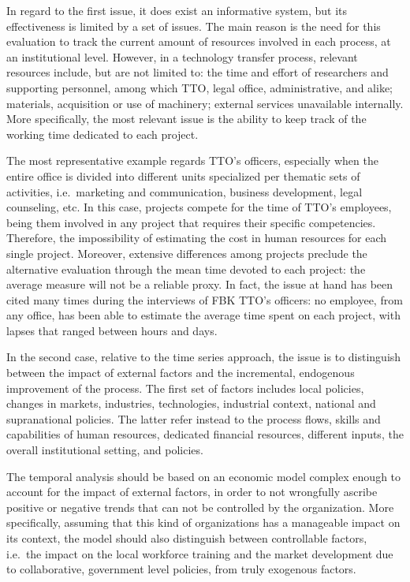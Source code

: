 In regard to the first issue, it does exist an informative system, but its effectiveness is limited by a set of issues. The main reason is the need for this evaluation to track the current amount of resources involved in each process, at an institutional level. However, in a technology transfer process, relevant resources include, but are not limited to: the time and effort of researchers and supporting personnel, among which TTO, legal office, administrative, and alike; materials, acquisition or use of machinery; external services unavailable internally. More specifically, the most relevant issue is the ability to keep track of the working time dedicated to each project. 

The most representative example regards TTO's officers, especially when the entire office is divided into different units specialized per thematic sets of activities, i.e.\ marketing and communication, business development, legal counseling, etc. In this case, projects compete for the time of TTO's employees, being them involved in any project that requires their specific competencies. Therefore, the impossibility of estimating the cost in human resources for each single project. Moreover, extensive differences among projects preclude the alternative evaluation through the mean time devoted to each project: the average measure will not be a reliable proxy. In fact, the issue at hand has been cited many times during the interviews of FBK TTO's officers: no employee, from any office, has been able to estimate the average time spent on each project, with lapses that ranged between hours and days.

In the second case, relative to the time series approach, the issue is to distinguish between the impact of external factors and the incremental, endogenous improvement of the process. The first set of factors includes local policies, changes in markets, industries, technologies, industrial context, national and supranational policies. The latter refer instead to the process flows, skills and capabilities of human resources, dedicated financial resources, different inputs, the overall institutional setting, and policies.

The temporal analysis should be based on an economic model complex enough to account for the impact of external factors, in order to not wrongfully ascribe positive or negative trends that can not be controlled by the organization. More specifically, assuming that this kind of organizations has a manageable impact on its context, the model should also distinguish between controllable factors, i.e.\ the impact on the local workforce training and the market development due to collaborative, government level policies, from truly exogenous factors.

